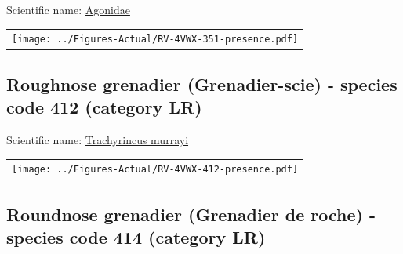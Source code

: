 \documentclass[12pt]{article}\usepackage[]{graphicx}\usepackage[]{color}
\begin{document}

Scientific name: \href{http://www.marinespecies.org/aphia.php?p=taxdetails\&id=125588}{Agonidae} \newline
\begin{minipage}{1.0\textwidth}
 \begin{tabular}{c}
\texttt{[image: ../Figures-Actual/RV-4VWX-351-presence.pdf]} \\ 
\end{tabular} 
\end{minipage}
\clearpage

\renewcommand\thefigure{\thesubsection\Alph{figure}}

\setcounter{figure}{0}

\hypertarget{sec:412}{%
\subsection{Roughnose grenadier (Grenadier-scie) - species code 412 (category LR)}\label{sec:412}}

  


Scientific name: \href{http://www.marinespecies.org/aphia.php?p=taxdetails\&id=126481}{Trachyrincus murrayi} \newline
\begin{minipage}{1.0\textwidth}
 \begin{tabular}{c}
\texttt{[image: ../Figures-Actual/RV-4VWX-412-presence.pdf]} \\ 
\end{tabular} 
\end{minipage}
\clearpage

\renewcommand\thefigure{\thesubsection\Alph{figure}}

\setcounter{figure}{0}

\hypertarget{sec:414}{%
\subsection{Roundnose grenadier (Grenadier de roche) - species code 414 (category LR)}\label{sec:414}}

  

\end{document}
